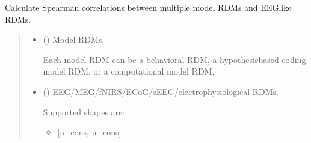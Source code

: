 \documentclass[letterpaper,10pt,english]{sphinxhowto}
\begin{document}

\begin{fulllineitems}
\label{\detokenize{corr_cal_by_rdm:neurora.corr_cal_by_rdm.rdms_corr}}
\pysigstartsignatures
{}
\pysigstopsignatures
\sphinxAtStartPar
Calculate Spearman correlations between multiple model RDMs and EEG\sphinxhyphen{}like RDMs.
\begin{quote}\begin{description}
\begin{itemize}
\item {} 
\sphinxAtStartPar
{} (\sphinxstyleliteralemphasis{\sphinxupquote{, }}\sphinxstyleliteralemphasis{\sphinxupquote{ {[}}}\sphinxstyleliteralemphasis{\sphinxupquote{, }}\sphinxstyleliteralemphasis{\sphinxupquote{, }}\sphinxstyleliteralemphasis{\sphinxupquote{{]}}}) \textendash{} 
\sphinxAtStartPar
Model RDMs.

\sphinxAtStartPar
Each model RDM can be a behavioral RDM, a hypothesis\sphinxhyphen{}based coding
model RDM, or a computational model RDM.


\item {} 
\sphinxAtStartPar
{} () \textendash{} 
\sphinxAtStartPar
EEG/MEG/fNIRS/ECoG/sEEG/electrophysiological RDMs.

\sphinxAtStartPar
Supported shapes are:
\begin{itemize}
\item {} 
\sphinxAtStartPar
{[}n\_cons, n\_cons{]}


\end{itemize}
\end{itemize}
\end{description}
\end{quote}
\end{fulllineitems}
\end{document}
